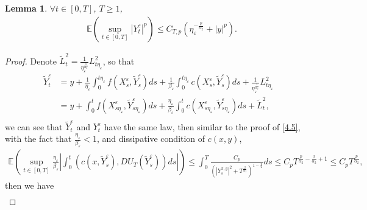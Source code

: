 \documentclass[11pt,reqno]{amsart}
\newtheorem{lemma}{\indent Lemma}[section]
\numberwithin{equation}{section}
\begin{document}
\begin{lemma}\label{L43}
	$\forall t\in [0,T]$,  $T\geq1$, 
		\begin{equation}
		\begin{split}\label{4L3}
			& \mathbb{E}\left(\sup_{t\in [0,T]} |Y_{t}^{\varepsilon}|^{p}\right)\leq C_{T,p}\left( \eta_{\varepsilon}^{-\frac{p}{\alpha_{2}}}+|y|^{p}\right) .
		\end{split}
	\end{equation}
\end{lemma}
\begin{proof}
	Denote $\tilde{L}^{2}_{t}=\frac{1}{\eta_{\varepsilon}^{\frac{1}{\alpha_{2}}}}L^{2}_{t\eta_{\varepsilon}}$, so that 
		\begin{equation}
		\begin{split}
			\tilde{Y}_{t}^{\varepsilon}&=y+\frac{1}{\eta_{\varepsilon}}\int ^{t\eta_{\varepsilon}}_{0}f(X_{s}^{\varepsilon},\tilde{Y}_{s}^{\varepsilon})ds+\frac{1}{\beta_{\varepsilon}}\int ^{t\eta_{\varepsilon}}_{0}c(X_{s}^{\varepsilon},\tilde{Y}_{s}^{\varepsilon})ds+\frac{1}{\eta_{\varepsilon}^{\frac{1}{\alpha_{2}}}}L^{2}_{t\eta_{\varepsilon}}\\
			&=y+\int ^{t}_{0}f(X_{s\eta_{\varepsilon}}^{\varepsilon},\tilde{Y}_{s\eta_{\varepsilon}}^{\varepsilon})ds+\frac{\eta_{\varepsilon}}{\beta_{\varepsilon}}\int ^{t}_{0}c(X_{s\eta_{\varepsilon}}^{\varepsilon},\tilde{Y}_{s\eta_{\varepsilon}}^{\varepsilon})ds+\tilde{L}^{2}_{t},\\
		\end{split}\nonumber
	\end{equation}
we can see that $\tilde{Y}_{t}^{\varepsilon}$ and $Y_{t}^{\varepsilon}$ have the same law, then similar to the proof of \eqref{4.5}, with the fact that $\frac{\eta_{\varepsilon}}{\beta_{\varepsilon}}<1$, and dissipative condition of $c(x,y)$,
	\begin{equation}
	\begin{split}
	\mathbb{E}\left(\sup_{t\in [0,T]} \frac{\eta_{\varepsilon}}{\beta_{\varepsilon}}\left| \int_{0}^{t}  (c(x,\tilde{Y}_{s}^{\varepsilon}),DU_{T}(\tilde{Y}_{s}^{\varepsilon})) ds \right| \right) \leq \int_{0}^{T} \frac{C_{p}}{(|Y_{s}^{ x,y}|^{2}+T^{\frac{2}{\alpha_{2}}})^{1-\frac{p}{2}}}ds\leq C_{p}T^{\frac{p}{\alpha_{2}}-\frac{2}{\alpha_{2}}+1}\leq C_{p}T^{\frac{p}{\alpha_{2}}},	\end{split}\nonumber
\end{equation}
then we have
	\begin{equation}
	\begin{split}

\end{split}
\end{equation}
\end{proof}
\end{document}
